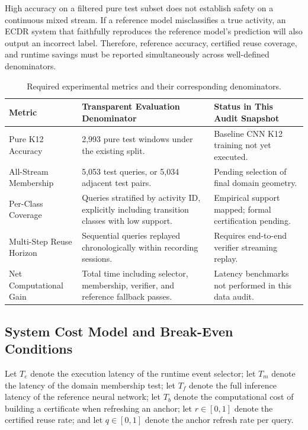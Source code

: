 \documentclass[11pt,a4paper]{article}
\theoremstyle{definition}
\begin{document}
High accuracy on a filtered pure test subset does not establish safety on a continuous mixed stream. If a reference model misclassifies a true activity, an ECDR system that faithfully reproduces the reference model's prediction will also output an incorrect label. Therefore, reference accuracy, certified reuse coverage, and runtime savings must be reported simultaneously across well-defined denominators.

\begin{table}[htbp]\centering\small
\begin{tabularx}{\linewidth}{@{}P{3.2cm}Y Y@{}}\toprule
Metric & Transparent Evaluation Denominator & Status in This Audit Snapshot\\\midrule
Pure K12 Accuracy & 2,993 pure test windows under the existing split. & Baseline CNN K12 training not yet executed.\\
All-Stream Membership & 5,053 test queries, or 5,034 adjacent test pairs. & Pending selection of final domain geometry.\\
Per-Class Coverage & Queries stratified by activity ID, explicitly including transition classes with low support. & Empirical support mapped; formal certification pending.\\
Multi-Step Reuse Horizon & Sequential queries replayed chronologically within recording sessions. & Requires end-to-end verifier streaming replay.\\
Net Computational Gain & Total time including selector, membership, verifier, and reference fallback passes. & Latency benchmarks not performed in this data audit.\\\bottomrule
\end{tabularx}
\caption{Required experimental metrics and their corresponding denominators.}
\end{table}

\subsection{System Cost Model and Break-Even Conditions}
Let $T_e$ denote the execution latency of the runtime event selector; let $T_m$ denote the latency of the domain membership test; let $T_f$ denote the full inference latency of the reference neural network; let $T_b$ denote the computational cost of building a certificate when refreshing an anchor; let $r \in [0, 1]$ denote the certified reuse rate; and let $q \in [0, 1]$ denote the anchor refresh rate per query.
\end{document}
